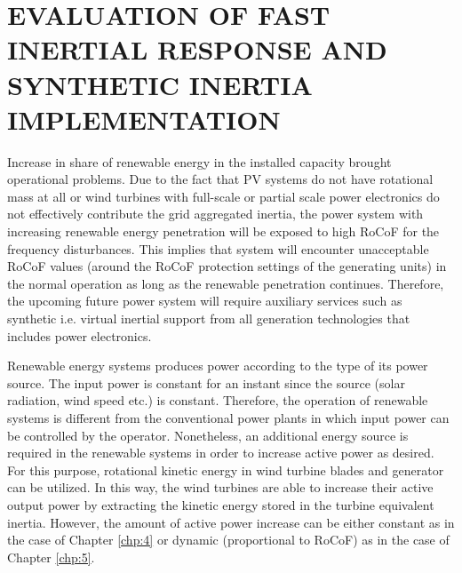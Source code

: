 \chapter{EVALUATION OF FAST INERTIAL RESPONSE AND SYNTHETIC INERTIA IMPLEMENTATION}
\label{chp:6}
Increase in share of renewable energy in the installed capacity brought operational problems. Due to the fact that PV systems do not have rotational mass at all or wind turbines with full-scale or partial scale power electronics do not effectively contribute the grid aggregated inertia, the power system with increasing renewable energy penetration will be exposed to high RoCoF for the frequency disturbances. This implies that system will encounter unacceptable RoCoF values (around the RoCoF protection settings of the generating units) in the normal operation as long as the renewable penetration continues. Therefore, the upcoming future power system will require auxiliary services such as synthetic i.e. virtual inertial support from all generation technologies that includes power electronics. \par
Renewable energy systems produces power according to the type of its power source. The input power is constant for an instant since the source (solar radiation, wind speed etc.) is constant. Therefore, the operation of renewable systems is different from the conventional power plants in which input power can be controlled by the operator. Nonetheless, an additional energy source is required in the renewable systems in order to increase active power as desired. For this purpose, rotational kinetic energy in wind turbine blades and generator can be utilized. In this way, the wind turbines are able to increase their active output power by extracting the kinetic energy stored in the turbine equivalent inertia. However, the amount of active power increase can be either constant as in the case of Chapter \ref{chp:4} or dynamic (proportional to RoCoF) as in the case of Chapter \ref{chp:5}.
